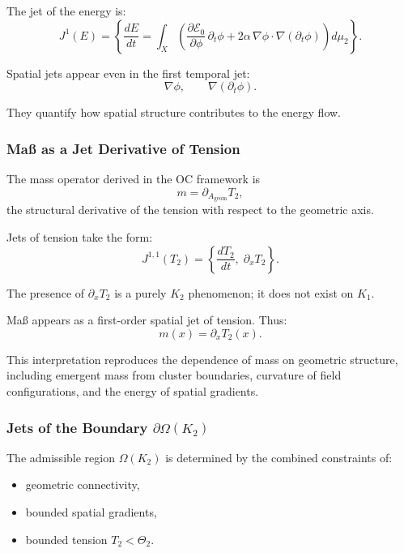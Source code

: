 The jet of the energy is:
\[
J^1(E) =
\left\{
\frac{dE}{dt} =
\int_X
\left(
\frac{\partial\mathcal{E}_0}{\partial\phi}\,\partial_t \phi
+
2\alpha\, \nabla\phi \cdot \nabla(\partial_t \phi)
\right)
d\mu_2
\right\}.
\]

Spatial jets appear even in the first temporal jet:
\[
\nabla \phi,\qquad \nabla(\partial_t \phi).
\]

They quantify how spatial structure contributes to the energy flow.



\subsubsection{Maß as a Jet Derivative of Tension}

The mass operator derived in the OC framework is
\[
m = \partial_{A_{\mathrm{geom}}} T_2,
\]
the structural derivative of the tension with respect to the geometric
axis.

Jets of tension take the form:
\[
J^{1,1}(T_2) =
\left\{
\frac{dT_2}{dt},\;
\partial_x T_2
\right\}.
\]

The presence of $\partial_x T_2$ is a purely $K_2$ phenomenon; it does
not exist on $K_1$.

Maß appears as a first-order spatial jet of tension. Thus:
\[
m(x) = \partial_x T_2(x).
\]

This interpretation reproduces the dependence of mass on geometric
structure, including emergent mass from cluster boundaries, curvature of
field configurations, and the energy of spatial gradients.



\subsubsection{Jets of the Boundary \texorpdfstring{\texorpdfstring{$\partial\Omega(K_2)$}{\partial\Omega(K_2)}}{Boundary}}

The admissible region $\Omega(K_2)$ is determined by the combined
constraints of:

\begin{itemize}
    \item geometric connectivity,
    \item bounded spatial gradients,
    \item bounded tension $T_2<\Theta_2$.
\end{itemize}

